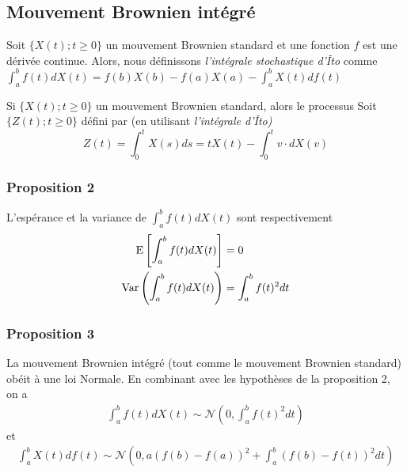 \documentclass[10pt, french]{article}
\begin{document}
\begin{multicols*}{2}
\subsection*{Mouvement Brownien intégré}
\begin{definition}
Soit $\{X(t) ; t \geq 0 \}$ un mouvement Brownien standard et une fonction $f$ est une dérivée continue. Alors, nous définissons \emph{l'intégrale stochastique d'Îto} comme \\
$\int_{a}^{b} f(t) d X(t) = f(b) X(b) - f(a) X(a) - \int_{a}^{b} X(t) d f(t)$
\end{definition}

\begin{definition}
Si $\{X(t) ; t \geq 0 \}$ un mouvement Brownien standard, alors le processus Soit $\{Z(t) ; t \geq 0 \}$ défini par (en utilisant \emph{l'intégrale d'Îto)}
\[Z(t) = \int_{0}^{t} X(s) ds = t X(t) - \int_{0}^{t} v \cdot  d X(v) \]
\end{definition}


\subsubsection*{Proposition 2}
L'espérance et la variance de $\int_{a}^{b} f(t) d X(t) $ sont respectivement
\begin{align*}
\mathrm{E} \left[ \int_{a}^{b} f(t) d X(t)  \right] & = 0 \\
\mathrm{Var} \left( \int_{a}^{b} f(t) d X(t)   \right) & =  \int_{a}^{b} f(t)^2 dt \\
\end{align*}


\subsubsection*{Proposition 3}
La mouvement Brownien intégré (tout comme le mouvement Brownien standard) obéit à une loi Normale. En combinant avec les hypothèses de la proposition 2, on a
\begin{align*}
\int_{a}^{b} f(t) d X(t) \sim \mathcal{N} \left( 0 , \int_{a}^{b} f(t)^2 dt \right)
\end{align*}
et
\begin{align*}
\int_{a}^{b} X(t) d f(t) \sim \mathcal{N} \left( 0, a\left(f(b) - f(a)\right)^2 + \int_{a}^{b} \left( f(b) - f(t) \right)^2 dt \right)
\end{align*}





\end{multicols*}

\end{document}
